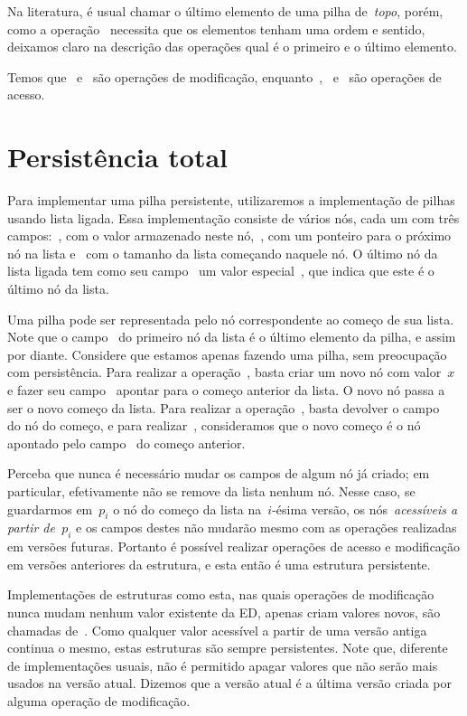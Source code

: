 \documentclass[main.tex]{subfiles}
\begin{document}
Na literatura, é usual chamar o último elemento de uma pilha de~\emph{topo}, porém, como a operação~ necessita que os elementos tenham uma ordem e sentido, deixamos claro na descrição das operações qual é o primeiro e o último elemento.

Temos que~ e~ são operações de modificação, enquanto~,~ e~ são operações de acesso.

\section{Persistência total}

Para implementar uma pilha persistente, utilizaremos a implementação de pilhas usando lista ligada. Essa implementação consiste de vários nós, cada um com três campos:~, com o valor armazenado neste nó,~, com um ponteiro para o próximo nó na lista e~ com o tamanho da lista começando naquele nó. O último nó da lista ligada tem como seu campo~ um valor especial~, que indica que este é o último nó da lista.

Uma pilha pode ser representada pelo nó correspondente ao começo de sua lista. Note que o campo~ do primeiro nó da lista é o último elemento da pilha, e assim por diante. Considere que estamos apenas fazendo uma pilha, sem preocupação com persistência.
Para realizar a operação~, basta criar um novo nó com valor~$x$ e fazer seu campo~ apontar para o começo anterior da lista. O novo nó passa a ser o novo começo da lista. Para realizar a operação~, basta devolver o campo~ do nó do começo, e para realizar~, consideramos que o novo começo é o nó apontado pelo campo~ do começo anterior.

Perceba que nunca é necessário mudar os campos de algum nó já criado; em particular, efetivamente não se remove da lista nenhum nó. Nesse caso, se guardarmos em~$p_i$ o nó do começo da lista na~$i$-ésima versão, os nós~\emph{acessíveis a partir de~$p_i$} e os campos destes não mudarão mesmo com as operações realizadas em versões futuras. Portanto é possível realizar operações de acesso e modificação em versões anteriores da estrutura, e esta então é uma estrutura persistente.

Implementações de estruturas como esta, nas quais operações de modificação nunca mudam nenhum valor existente da ED, apenas criam valores novos, são chamadas de~. Como qualquer valor acessível a partir de uma versão antiga continua o mesmo, estas estruturas são sempre persistentes. Note que, diferente de implementações usuais, não é permitido apagar valores que não serão mais usados na versão atual. Dizemos que a versão atual é a última versão criada por alguma operação de modificação.
\end{document}
